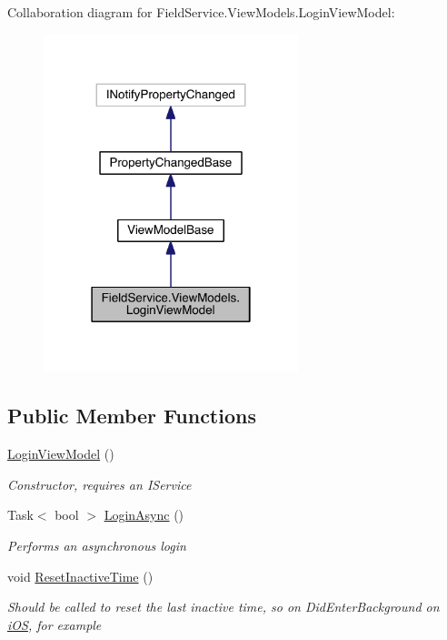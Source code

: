Collaboration diagram for Field\+Service.\+View\+Models.\+Login\+View\+Model\+:
\nopagebreak
\begin{figure}[H]
\begin{center}
\leavevmode
\includegraphics[width=210pt]{class_field_service_1_1_view_models_1_1_login_view_model__coll__graph}
\end{center}
\end{figure}
\subsection*{Public Member Functions}
\begin{DoxyCompactItemize}
\item 
\hyperlink{class_field_service_1_1_view_models_1_1_login_view_model_a7e651c456cfb677706542a0948d81d5c}{Login\+View\+Model} ()
\begin{DoxyCompactList}\small\item\em Constructor, requires an I\+Service \end{DoxyCompactList}\item 
Task$<$ bool $>$ \hyperlink{class_field_service_1_1_view_models_1_1_login_view_model_a0ae178c7e04dfbfcb641a2c164e2fb0f}{Login\+Async} ()
\begin{DoxyCompactList}\small\item\em Performs an asynchronous login \end{DoxyCompactList}\item 
void \hyperlink{class_field_service_1_1_view_models_1_1_login_view_model_ab3244c476ac9cb58ced4ffe86b4b4ad6}{Reset\+Inactive\+Time} ()
\begin{DoxyCompactList}\small\item\em Should be called to reset the last inactive time, so on Did\+Enter\+Background on \hyperlink{namespace_field_service_1_1i_o_s}{i\+O\+S}, for example \end{DoxyCompactList}\end{DoxyCompactItemize}
